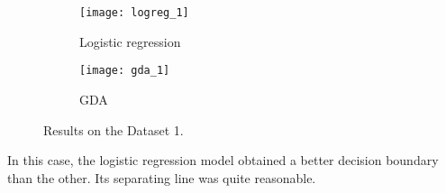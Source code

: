 \begin{answer}
\begin{figure}[H]
	\centering
	\begin{subfigure}[H]{0.45\linewidth}
		\texttt{[image: logreg\_1]}
		\caption{Logistic regression}
	\end{subfigure}
	\begin{subfigure}[H]{0.45\linewidth}
		\texttt{[image: gda\_1]}
		\caption{GDA}
	\end{subfigure}
	\caption{Results on the Dataset 1.}
\end{figure}
In this case, the logistic regression model obtained a better decision boundary than the other. Its separating line was quite reasonable. \\	
\end{answer}
